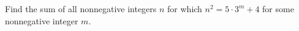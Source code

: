 Find the sum of all nonnegative integers $n$ for which $n^2=5\cdot3^m+4$ for some nonnegative integer $m$.
